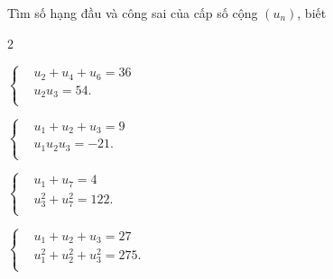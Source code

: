 \begin{bt}%
	Tìm số hạng đầu và công sai của cấp số cộng $(u_n)$, biết
	\begin{enumEX}{2}
		\item $\left\{\begin{aligned} 
			&u_2+u_4+u_6=36 \\
			&u_2u_3=54. \\
		\end{aligned}\right. $
		\item $\left\{\begin{aligned} 
			&u_1+u_2+u_3=9 \\
			&u_1u_2u_3=-21. \\
		\end{aligned}\right. $ 
		\item $\left\{\begin{aligned} 
			&u_1+u_7=4 \\
			&u_3^2+u_7^2=122. \\
		\end{aligned}\right. $
		\item $\left\{\begin{aligned} 
			&u_1+u_2+u_3=27 \\
			&u_1^2+u_2^2+u_3^2=275. \\
		\end{aligned}\right. $ 
	\end{enumEX}
\end{bt}

